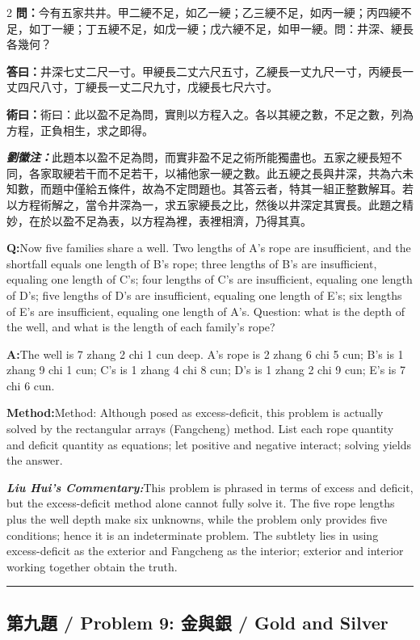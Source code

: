 \documentclass[11pt,a4paper]{article}
\newcommand{\cnwen}{\textcolor{cnlabelfg}{\textbf{問：}}}
\newcommand{\cnda}{\textbf{答曰：}}
\newcommand{\cnshu}{\textcolor{cnlabelfg}{\textbf{術曰：}}}
\newcommand{\cnzhu}{\textcolor{commentarycolor}{\textit{\textbf{劉徽注：}}}}
\newcommand{\enwen}{\textcolor{enlabelfg}{\textbf{Q:}}}
\newcommand{\enda}{\textcolor{enlabelfg}{\textbf{A:}}}
\newcommand{\enshu}{\textcolor{enlabelfg}{\textbf{Method:}}}
\newcommand{\enzhu}{\textcolor{enlabelfg}{\textit{\textbf{Liu Hui's Commentary:}}}}
\begin{document}
\begin{paracol}{2}
\switchcolumn[0]
\cnwen 今有五家共井。甲二綆不足，如乙一綆；乙三綆不足，如丙一綆；丙四綆不足，如丁一綆；丁五綆不足，如戊一綆；戊六綆不足，如甲一綆。問：井深、綆長各幾何？

\cnda 井深七丈二尺一寸。甲綆長二丈六尺五寸，乙綆長一丈九尺一寸，丙綆長一丈四尺八寸，丁綆長一丈二尺九寸，戊綆長七尺六寸。

\cnshu 術曰：此以盈不足為問，實則以方程入之。各以其綆之數，不足之數，列為方程，正負相生，求之即得。

\cnzhu 此題本以盈不足為問，而實非盈不足之術所能獨盡也。五家之綆長短不同，各家取綆若干而不足若干，以補他家一綆之數。此五綆之長與井深，共為六未知數，而題中僅給五條件，故為不定問題也。其答云者，特其一組正整數解耳。若以方程術解之，當令井深為一，求五家綆長之比，然後以井深定其實長。此題之精妙，在於以盈不足為表，以方程為裡，表裡相濟，乃得其真。

\switchcolumn[1]
\enwen Now five families share a well. Two lengths of A's rope are insufficient, and the shortfall equals one length of B's rope; three lengths of B's are insufficient, equaling one length of C's; four lengths of C's are insufficient, equaling one length of D's; five lengths of D's are insufficient, equaling one length of E's; six lengths of E's are insufficient, equaling one length of A's. Question: what is the depth of the well, and what is the length of each family's rope?

\enda The well is 7 zhang 2 chi 1 cun deep. A's rope is 2 zhang 6 chi 5 cun; B's is 1 zhang 9 chi 1 cun; C's is 1 zhang 4 chi 8 cun; D's is 1 zhang 2 chi 9 cun; E's is 7 chi 6 cun.

\enshu Method: Although posed as excess-deficit, this problem is actually solved by the rectangular arrays (Fangcheng) method. List each rope quantity and deficit quantity as equations; let positive and negative interact; solving yields the answer.

\enzhu This problem is phrased in terms of excess and deficit, but the excess-deficit method alone cannot fully solve it. The five rope lengths plus the well depth make six unknowns, while the problem only provides five conditions; hence it is an indeterminate problem. The subtlety lies in using excess-deficit as the exterior and Fangcheng as the interior; exterior and interior working together obtain the truth.
\end{paracol}

\bigskip\hrule\bigskip

\subsection{第九題 / Problem 9: 金與銀 / Gold and Silver}
\end{document}
